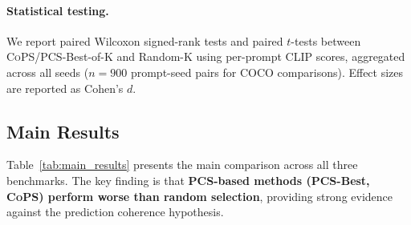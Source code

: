 \documentclass{article}
\newcommand{\cops}{\textsc{CoPS}}
\newcommand{\pcs}{\textsc{PCS}}
\begin{document}
\paragraph{Statistical testing.} We report paired Wilcoxon signed-rank tests and paired $t$-tests between \cops{}/PCS-Best-of-K and Random-K using per-prompt CLIP scores, aggregated across all seeds ($n = 900$ prompt-seed pairs for COCO comparisons). Effect sizes are reported as Cohen's $d$.

\subsection{Main Results}

Table~\ref{tab:main_results} presents the main comparison across all three benchmarks. The key finding is that \textbf{\pcs{}-based methods (PCS-Best, \cops{}) perform worse than random selection}, providing strong evidence against the prediction coherence hypothesis.
\end{document}
